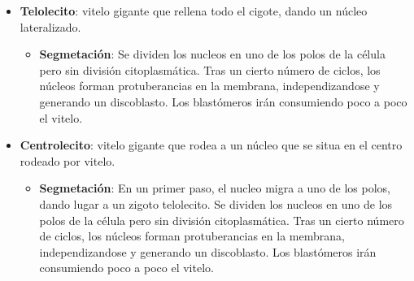 \begin{itemize}[itemsep=0pt,parsep=0pt,topsep=0pt,partopsep=0pt]
\begin{itemize}[itemsep=0pt,parsep=0pt,topsep=0pt,partopsep=0pt]
    \end{itemize}
    \item\textbf{Telolecito}: vitelo gigante que rellena todo el cigote, dando un núcleo lateralizado.
    \begin{itemize}[itemsep=0pt,parsep=0pt,topsep=0pt,partopsep=0pt]
        \item \textbf{Segmetación}: Se dividen los nucleos en uno de los polos de la célula pero sin división citoplasmática. Tras un cierto número de ciclos, los núcleos forman protuberancias en la membrana, independizandose y generando un discoblasto. Los blastómeros irán consumiendo poco a poco el vitelo.
    \end{itemize}
    \item\textbf{Centrolecito}: vitelo gigante que rodea a un núcleo que se situa en el centro rodeado por vitelo.
    \begin{itemize}[itemsep=0pt,parsep=0pt,topsep=0pt,partopsep=0pt]
        \item \textbf{Segmetación}: En un primer paso, el nucleo migra a uno de los polos, dando lugar a un zigoto telolecito. Se dividen los nucleos en uno de los polos de la célula pero sin división citoplasmática. Tras un cierto número de ciclos, los núcleos forman protuberancias en la membrana, independizandose y generando un discoblasto. Los blastómeros irán consumiendo poco a poco el vitelo.
    \end{itemize}
\end{itemize}


